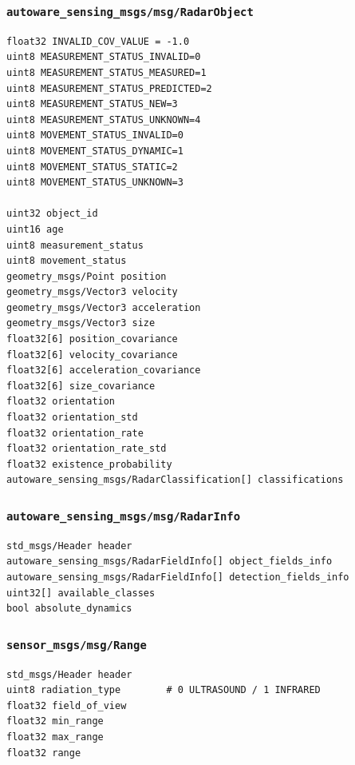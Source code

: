 \documentclass[
]{article}
\begin{document}
\subsubsection{\texorpdfstring{\texttt{autoware\_sensing\_msgs/msg/RadarObject}}{autoware\_sensing\_msgs/msg/RadarObject}}\label{autoware_sensing_msgsmsgradarobject}

\begin{verbatim}
float32 INVALID_COV_VALUE = -1.0
uint8 MEASUREMENT_STATUS_INVALID=0
uint8 MEASUREMENT_STATUS_MEASURED=1
uint8 MEASUREMENT_STATUS_PREDICTED=2
uint8 MEASUREMENT_STATUS_NEW=3
uint8 MEASUREMENT_STATUS_UNKNOWN=4
uint8 MOVEMENT_STATUS_INVALID=0
uint8 MOVEMENT_STATUS_DYNAMIC=1
uint8 MOVEMENT_STATUS_STATIC=2
uint8 MOVEMENT_STATUS_UNKNOWN=3

uint32 object_id
uint16 age
uint8 measurement_status
uint8 movement_status
geometry_msgs/Point position
geometry_msgs/Vector3 velocity
geometry_msgs/Vector3 acceleration
geometry_msgs/Vector3 size
float32[6] position_covariance
float32[6] velocity_covariance
float32[6] acceleration_covariance
float32[6] size_covariance
float32 orientation
float32 orientation_std
float32 orientation_rate
float32 orientation_rate_std
float32 existence_probability
autoware_sensing_msgs/RadarClassification[] classifications
\end{verbatim}

\subsubsection{\texorpdfstring{\texttt{autoware\_sensing\_msgs/msg/RadarInfo}}{autoware\_sensing\_msgs/msg/RadarInfo}}\label{autoware_sensing_msgsmsgradarinfo}

\begin{verbatim}
std_msgs/Header header
autoware_sensing_msgs/RadarFieldInfo[] object_fields_info
autoware_sensing_msgs/RadarFieldInfo[] detection_fields_info
uint32[] available_classes
bool absolute_dynamics
\end{verbatim}

\subsubsection{\texorpdfstring{\texttt{sensor\_msgs/msg/Range}}{sensor\_msgs/msg/Range}}\label{sensor_msgsmsgrange}

\begin{verbatim}
std_msgs/Header header
uint8 radiation_type        # 0 ULTRASOUND / 1 INFRARED
float32 field_of_view
float32 min_range
float32 max_range
float32 range
\end{verbatim}
\end{document}
